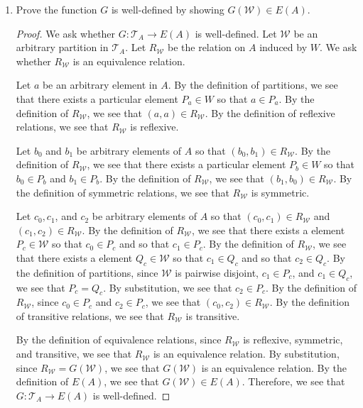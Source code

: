 \documentclass{amsart}
\newcommand{\W}{\mathcal{W}}
\newcommand{\T}{\mathcal{T}}
\numberwithin{equation}{section}
\begin{document}
\begin{problem}[manual-num=56]
\begin{enumerate}
\begin{proof}
				By the definition of partitions, since $A / \sim$ contains no empty subsets, is pairwise disjoint, and is exhaustive, we see that $A / \sim$ is a partition.
				By substitution, since $A / \sim = F(\sim)$, we see that $F(\sim)$ is a partition.
				By the definition of $\T_A$, we see that $F(\sim) \in \T_A$.
				Therefore, we see that $F: E(A) \rightarrow \T_A$ is well-defined.
			\end{proof}

			\item
			Prove the function $G$ is well-defined by showing $G(\W) \in E(A)$.

			\begin{proof}
				We ask whether $G : \T_A \rightarrow E(A)$ is well-defined.
				Let $\W$ be an arbitrary partition in $\T_A$.
				Let $R_\W$ be the relation on $A$ induced by $W$.
				We ask whether $R_\W$ is an equivalence relation.

				Let $a$ be an arbitrary element in $A$.
				By the definition of partitions, we see that there exists a particular element $P_a \in W$ so that $a \in P_a$.
				By the definition of $R_\W$, we see that $(a, a) \in R_\W$.
				By the definition of reflexive relations, we see that $R_\W$ is reflexive.

				Let $b_0$ and $b_1$ be arbitrary elements of $A$ so that $(b_0, b_1) \in R_\W$.
				By the definition of $R_\W$, we see that there exists a particular element $P_b \in W$ so that $b_0 \in P_b$ and $b_1 \in P_b$.
				By the definition of $R_\W$, we see that $(b_1, b_0) \in R_\W$.
				By the definition of symmetric relations, we see that $R_\W$ is symmetric.

				Let $c_0, c_1$, and $c_2$ be arbitrary elements of $A$ so that $(c_0, c_1) \in R_\W$ and $(c_1, c_2) \in R_\W$.
				By the definition of $R_\W$, we see that there exists a element $P_c \in \W$ so that $c_0 \in P_c$ and so that $c_1 \in P_c$.
				By the definition of $R_\W$, we see that there exists a element $Q_c \in \W$ so that $c_1 \in Q_c$ and so that $c_2 \in Q_c$.
				By the definition of partitions, since $\W$ is pairwise disjoint, $c_1 \in P_c$, and $c_1 \in Q_c$, we see that $P_c = Q_c$.
				By substitution, we see that $c_2 \in P_c$.
				By the definition of $R_\W$, since $c_0 \in P_c$ and $c_2 \in P_c$, we see that $(c_0, c_2) \in R_\W$.
				By the definition of transitive relations, we see that $R_\W$ is transitive.

				By the definition of equivalence relations, since $R_\W$ is reflexive, symmetric, and transitive, we see that $R_\W$ is an equivalence relation.
				By substitution, since $R_\W = G(\W)$, we see that $G(\W)$ is an equivalence relation.
				By the definition of $E(A)$, we see that $G(\W) \in E(A)$.
				Therefore, we see that $G : \T_A \rightarrow E(A)$ is well-defined.
			\end{proof}


\end{enumerate}
\end{problem}
\end{document}
